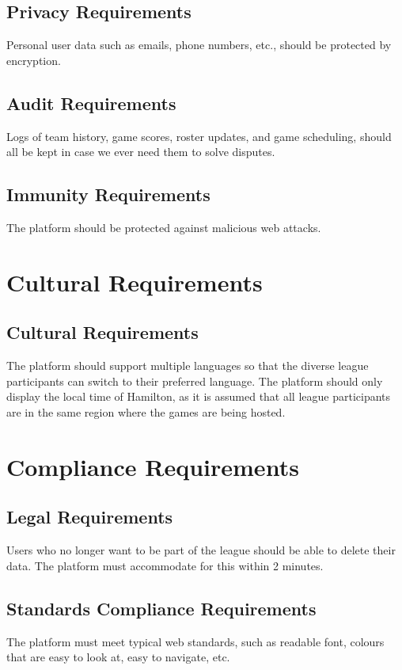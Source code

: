 \documentclass[12pt]{article}
\begin{document}
\subsection{Privacy Requirements}
Personal user data such as emails, phone numbers, etc., should be protected by encryption.

\subsection{Audit Requirements}
Logs of team history, game scores, roster updates, and game scheduling, should all be kept in case we ever need them to solve disputes.

\subsection{Immunity Requirements}
The platform should be protected against malicious web attacks.

\section{Cultural Requirements}
\subsection{Cultural Requirements}
The platform should support multiple languages so that the diverse league participants can switch to their preferred language. The platform should only display the local time of Hamilton, as it is assumed that all league participants are in the same region where the games are being hosted.

\section{Compliance Requirements}
\subsection{Legal Requirements}
Users who no longer want to be part of the league should be able to delete their data. The platform must accommodate for this within 2 minutes.

\subsection{Standards Compliance Requirements}
The platform must meet typical web standards, such as readable font, colours that are easy to look at, easy to navigate, etc.
\end{document}
